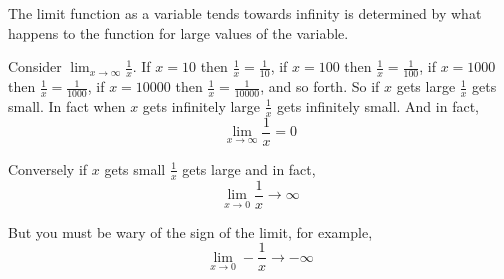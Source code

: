\documentclass{oxmathproblems}
\begin{document}
The limit function as a variable tends towards infinity is determined by what happens to the function for large values of the variable.

Consider $\displaystyle{\lim_{x\to \infty} \frac{1}{x}}$. If $x=10$ then $\frac{1}{x}=\frac{1}{10}$, if $x=100$ then $\frac{1}{x}=\frac{1}{100}$, if $x=1000$ then $\frac{1}{x}=\frac{1}{1000}$, if $x=10000$ then $\frac{1}{x}=\frac{1}{10000}$, and so forth. So if $x$ gets large $\frac{1}{x}$ gets small. In fact when $x$ gets infinitely large $\frac{1}{x}$ gets infinitely small. And in fact, $$\lim_{x\to\infty} \frac{1}{x}=0$$

Conversely if $x$ gets small $\frac{1}{x}$ gets large and in fact,
$$\lim_{x\to 0} \frac{1}{x}\to\infty$$

But you must be wary of the sign of the limit, for example,
$$\lim_{x\to 0} -\frac{1}{x}\to-\infty$$

\begin{questions}
\question Calculate$\displaystyle{\lim_{z\to \infty} -z^2}$
\vspace{2in}
\question
Calculate $\displaystyle{\lim_{y\to \infty} 10^y}$
\vspace{2in}
\question
Calculate $\displaystyle{lim_{x\to \infty} 10^{-x}}$
\vspace{2in}
Calculate $\displaystyle{\lim_{x\to 0} e^{-{\frac{1}{x}}}$
\end{questions}
\end{document}
